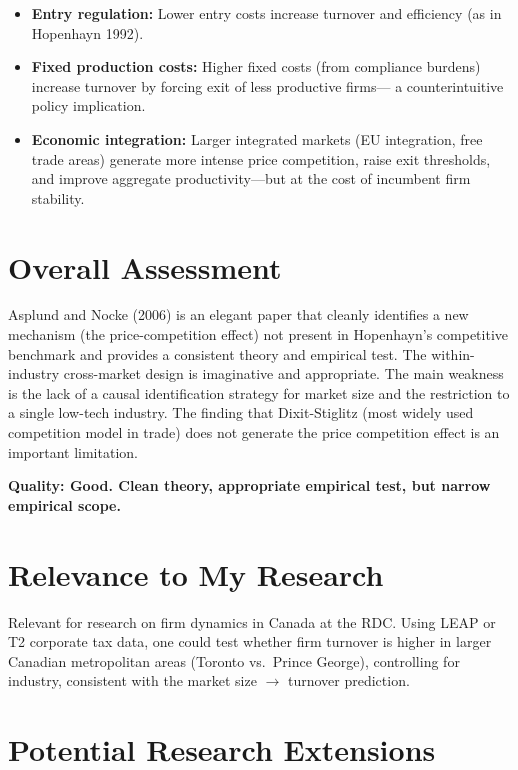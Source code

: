 \begin{itemize}
  \item \textbf{Entry regulation:} Lower entry costs increase turnover and
    efficiency (as in Hopenhayn 1992).
  \item \textbf{Fixed production costs:} Higher fixed costs (from compliance
    burdens) increase turnover by forcing exit of less productive firms---
    a counterintuitive policy implication.
  \item \textbf{Economic integration:} Larger integrated markets (EU
    integration, free trade areas) generate more intense price competition,
    raise exit thresholds, and improve aggregate productivity---but at the
    cost of incumbent firm stability.
\end{itemize}

\section{Overall Assessment}

Asplund and Nocke (2006) is an elegant paper that cleanly identifies a new
mechanism (the price-competition effect) not present in Hopenhayn's competitive
benchmark and provides a consistent theory and empirical test. The within-
industry cross-market design is imaginative and appropriate. The main weakness
is the lack of a causal identification strategy for market size and the
restriction to a single low-tech industry. The finding that Dixit-Stiglitz
(most widely used competition model in trade) does not generate the price
competition effect is an important limitation.

\textbf{Quality: Good. Clean theory, appropriate empirical test, but
narrow empirical scope.}

\section{Relevance to My Research}

Relevant for research on firm dynamics in Canada at the RDC. Using LEAP or T2
corporate tax data, one could test whether firm turnover is higher in larger
Canadian metropolitan areas (Toronto vs.\ Prince George), controlling for
industry, consistent with the market size $\to$ turnover prediction.

\section{Potential Research Extensions}

